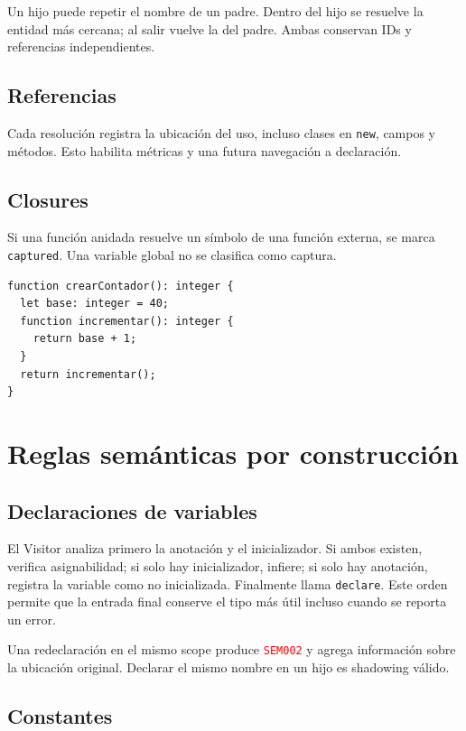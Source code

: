 \documentclass[11pt,letterpaper,oneside]{report}
\newcommand{\codigo}[1]{\texttt{#1}}
\newcommand{\diag}[1]{\textcolor{red}{\texttt{#1}}}
\begin{document}
Un hijo puede repetir el nombre de un padre. Dentro del hijo se resuelve la entidad
más cercana; al salir vuelve la del padre. Ambas conservan IDs y referencias
independientes.

\section{Referencias}

Cada resolución registra la ubicación del uso, incluso clases en \codigo{new}, campos
y métodos. Esto habilita métricas y una futura navegación a declaración.

\section{Closures}

Si una función anidada resuelve un símbolo de una función externa, se marca
\codigo{captured}. Una variable global no se clasifica como captura.

\begin{verbatim}
function crearContador(): integer {
  let base: integer = 40;
  function incrementar(): integer {
    return base + 1;
  }
  return incrementar();
}
\end{verbatim}

\chapter{Reglas semánticas por construcción}

\section{Declaraciones de variables}

El Visitor analiza primero la anotación y el inicializador. Si ambos existen, verifica
asignabilidad; si solo hay inicializador, infiere; si solo hay anotación, registra la
variable como no inicializada. Finalmente llama \codigo{declare}. Este orden permite
que la entrada final conserve el tipo más útil incluso cuando se reporta un error.

Una redeclaración en el mismo scope produce \diag{SEM002} y agrega información sobre
la ubicación original. Declarar el mismo nombre en un hijo es shadowing válido.

\section{Constantes}
\end{document}
